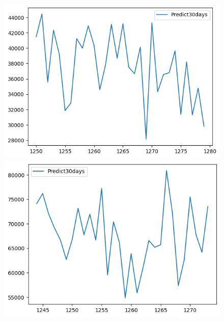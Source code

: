 \begin{figure}[H]
\begin{minipage}{0.15\textwidth}
    \end{minipage}
    \hfill
        \begin{minipage}{0.15\textwidth}
    \centering
    \includegraphics[width=1\textwidth]{resources/chapter-5/predicted/BIDV_ML_9_1_next30days.png}
    \end{minipage}
    \hfill
    \begin{minipage}{0.15\textwidth}
    \centering
    \includegraphics[width=1\textwidth]{resources/chapter-5/predicted/VCB_ML_7_3_next30days.png}
    \end{minipage}
    \hfill
    \begin{minipage}{0.15\textwidth}
    \centering

\end{minipage}
\end{figure}
